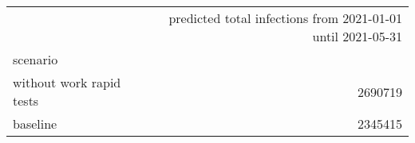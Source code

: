 \begin{tabular}{lr}
\toprule
{} &  predicted total infections from 2021-01-01 until 2021-05-31 \\
scenario                  &                                                              \\
\midrule
 without work rapid tests &                                            2690719 \\
 baseline                 &                                            2345415 \\
\bottomrule
\end{tabular}
